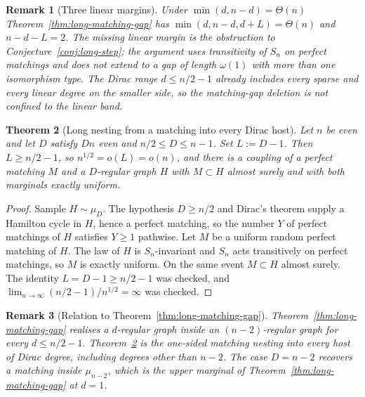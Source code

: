 \documentclass[11pt]{article}
\newtheorem{theorem}{Theorem}
\newtheorem{remark}[theorem]{Remark}
\begin{document}
\begin{remark}[Three linear margins]
\label{rem:long-matching-gap-vs-conj}
Under \(\min(d,n-d)=\Theta(n)\) Theorem~\ref{thm:long-matching-gap} has
\(\min(d,n-d,d+L)=\Theta(n)\) and \(n-d-L=2\). The missing linear margin is the
obstruction to Conjecture~\ref{conj:long-step}; the argument uses transitivity of
\(S_n\) on perfect matchings and does not extend to a gap of length
\(\omega(1)\) with more than one isomorphism type. The Dirac range
\(d\le n/2-1\) already includes every sparse and every linear degree on the
smaller side, so the matching-gap deletion is not confined to the linear band.
\end{remark}

\begin{theorem}[Long nesting from a matching into every Dirac host]
\label{thm:long-matching-into-dirac}
Let \(n\) be even and let \(D\) satisfy \(Dn\) even and \(n/2\le D\le n-1\). Set
\(L:=D-1\). Then \(L\ge n/2-1\), so \(n^{1/2}=o(L)=o(n)\), and there is a coupling
of a perfect matching \(M\) and a \(D\)-regular graph \(H\) with \(M\subset H\) almost
surely and with both marginals exactly uniform.
\end{theorem}

\begin{proof}
Sample \(H\sim\mu_D\). The hypothesis \(D\ge n/2\) and Dirac's theorem supply a
Hamilton cycle in \(H\), hence a perfect matching, so the number \(Y\) of perfect
matchings of \(H\) satisfies \(Y\ge 1\) pathwise.
Let \(M\) be a uniform random perfect matching of \(H\). The law of \(H\) is
\(S_n\)-invariant and \(S_n\) acts transitively on perfect matchings, so \(M\) is
exactly uniform. On the same event \(M\subset H\) almost surely.
The identity \(L=D-1\ge n/2-1\) was checked, and
\(\lim_{n\to\infty}(n/2-1)/n^{1/2}=\infty\) was checked.
\end{proof}

\begin{remark}[Relation to Theorem~\ref{thm:long-matching-gap}]
\label{rem:matching-into-dirac}
Theorem~\ref{thm:long-matching-gap} realises a \(d\)-regular graph inside an
\((n-2)\)-regular graph for every \(d\le n/2-1\). Theorem~\ref{thm:long-matching-into-dirac}
is the one-sided matching nesting into every host of Dirac degree, including
degrees other than \(n-2\). The case \(D=n-2\) recovers a matching inside
\(\mu_{n-2}\), which is the upper marginal of Theorem~\ref{thm:long-matching-gap}
at \(d=1\).
\end{remark}
\end{document}
